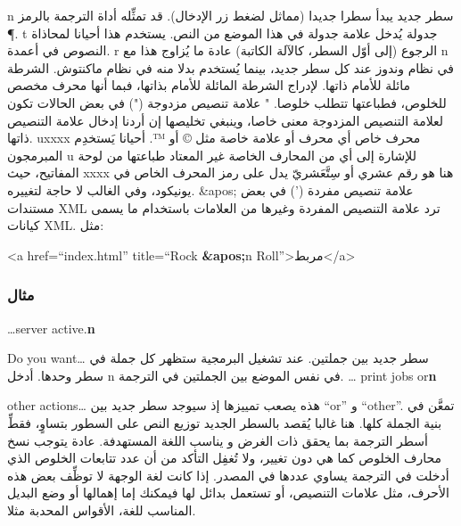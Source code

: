 \starttable[|l|l|l|]
\HL
\NC {} \NC {} \NC
{}\NC\AR
\HL
\NC {} n  \NC سطر جديد \NC يبدأ سطرا جديدا (مماثل لضغط زر
الإدخال). قد تمثِّله أداة الترجمة بالرمز ¶.\NC\AR
\HL
\NC {} t  \NC جدولة \NC يُدخل علامة جدولة في هذا الموضع من
النص. يستخدم هذا أحيانا لمحاذاة النصوص في أعمدة.\NC\AR
\HL
\NC {} r  \NC الرجوع (إلى أوّل السطر، كالآلة الكاتبة) \NC
عادة ما يُزاوج هذا مع ‪ n‬ في نظام وندوز عند كل سطر
جديد، بينما يُستخدم بدلا منه في نظام ماكنتوش.\NC\AR
\HL
\NC {} {}  \NC الشرطة مائلة للأمام ذاتها. 
\NC لإدراج الشرطة المائلة للأمام بذاتها، فبما أنها محرف مخصص للخلوص،
فطباعتها تتطلب خلوصا.\NC\AR
\HL
\NC {} " \NC علامة تنصيص مزدوجة (") \NC في بعض الحالات
تكون لعلامة التنصيص المزدوجة معنى خاصا، وينبغي تخليصها إن أردنا إدخال
علامة التنصيص ذاتها.\NC\AR
\HL
\NC {} uxxxx  \NC محرف خاص \NC أي محرف أو علامة خاصة مثل ©
أو ™. أحيانا يَستخدِم المبرمجون ‪ u‬ للإشارة إلى أي من
المحارف الخاصة غير المعتاد طباعتها من لوحة المفاتيح، حيث xxxx هنا هو
رقم عشري أو سِتَّعَشريّ يدل على رمز المحرف الخاص في يونيكود، وفي الغالب
لا حاجة لتغييره.\NC\AR
\HL
\NC \&apos;  \NC علامة تنصيص مفردة (') \NC في بعض مستندات XML ترد علامة
التنصيص المفردة وغيرها من العلامات باستخدام ما يسمى كيانات XML. مثل:

<a href=“index.html” title=“Rock {\bf \&apos;}n Roll”>مربط</a>\NC\AR
\HL
\stoptable
\subsubsection{مثال}
\starttable[|l|l|l|]
\HL
\NC {} \NC {} \NC
{}\NC\AR
\HL
\NC …server active.{\bf {} n}

Do you want…  \NC سطر جديد بين جملتين. عند تشغيل البرمجية ستظهر كل جملة
في سطر وحدها. \NC أدخل ‪ n‬ في نفس الموضع بين الجملتين
في الترجمة.\NC\AR
\HL
\NC … print jobs or{\bf {} n}

other actions…  \NC هذه يصعب تمييزها إذ سيوجد سطر جديد بين “or” و
“other”. \NC تمعَّن في بنية الجملة كلها. هنا غالبا يُقصد بالسطر الجديد
توزيع النص على السطور بتساوٍ، فقطِّ أسطر الترجمة بما يحقق ذات الغرض و
يناسب اللغة المستهدفة.\NC\AR
\HL
\stoptable
عادة يتوجب نسخ محارف الخلوص كما هي دون تغيير، ولا تُغفِل التأكد من أن
عدد تتابعات الخلوص الذي أدخلت في الترجمة يساوي عددها في المصدر. إذا
كانت لغة الوجهة لا توظِّف بعض هذه الأحرف، مثل علامات التنصيص، أو تستعمل
بدائل لها فيمكنك إما إهمالها أو وضع البديل المناسب للغة، الأقواس
المحدبة مثلا.

